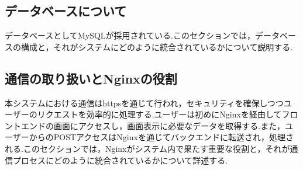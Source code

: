 \documentclass[b5paper,12pt,dvipdfmx]{jsreport}
\begin{document}
\subsection{データベースについて}
データベースとしてMySQLが採用されている.このセクションでは，データベースの構成と，それがシステムにどのように統合されているかについて説明する.

\subsection{通信の取り扱いとNginxの役割}
本システムにおける通信はhttpsを通じて行われ，セキュリティを確保しつつユーザーのリクエストを効率的に処理する.ユーザーは初めにNginxを経由してフロントエンドの画面にアクセスし，画面表示に必要なデータを取得する.また，ユーザーからのPOSTアクセスはNginxを通じてバックエンドに転送され，処理される.このセクションでは，Nginxがシステム内で果たす重要な役割と，それが通信プロセスにどのように統合されているかについて詳述する.





\end{document}
